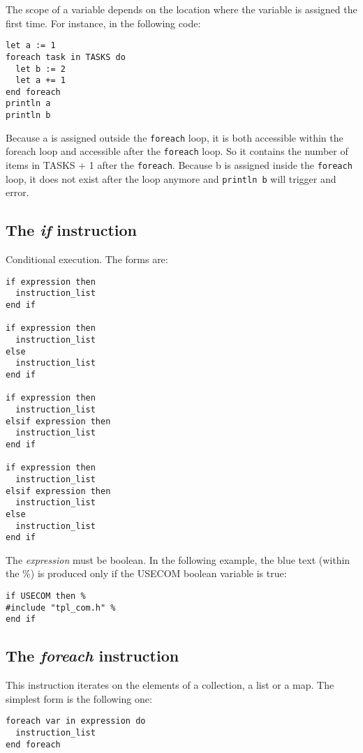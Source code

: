 \documentclass[11pt]{article}
\newcommand{\var}[1]{{\small\ttfamily #1}}
\begin{document}
The scope of a variable depends on the location where the variable is assigned the first time. For instance, in the following code:

\begin{lstlisting}
let a := 1
foreach task in TASKS do
  let b := 2
  let a += 1
end foreach
println a
println b
\end{lstlisting}

Because a is assigned outside the \lstinline{foreach} loop, it is both accessible within the foreach loop and accessible after the \lstinline{foreach} loop. So it contains the number of items in TASKS + 1 after the \lstinline{foreach}. Because b is assigned inside the \lstinline{foreach} loop, it does not exist after the loop anymore and \lstinline{println b} will trigger and error.

\subsection{The {\em if} instruction}

Conditional execution. The forms are:

\begin{lstlisting}
if expression then
  instruction_list
end if

if expression then
  instruction_list
else
  instruction_list
end if

if expression then
  instruction_list
elsif expression then
  instruction_list
end if

if expression then
  instruction_list
elsif expression then
  instruction_list
else
  instruction_list
end if
\end{lstlisting}    

The {\em expression} must be boolean. In the following example, the blue text (within the \%) is produced only if the \var{USECOM} boolean variable is true:

\begin{lstlisting}
if USECOM then %
#include "tpl_com.h" %
end if
\end{lstlisting}

\subsection{The {\em foreach} instruction}

This instruction iterates on the elements of a collection, a list or a map. The simplest form is the following one:

\begin{lstlisting}
foreach var in expression do
  instruction_list
end foreach
\end{lstlisting}
\end{document}
